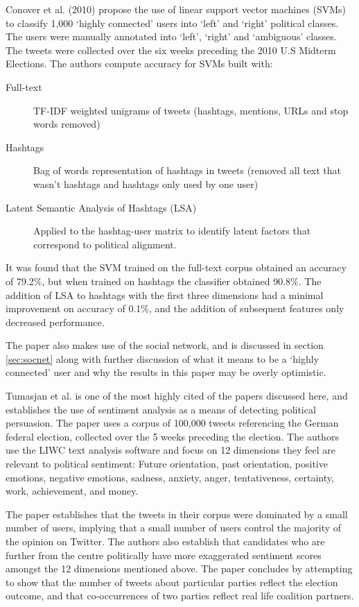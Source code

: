 \documentclass[bsc,frontabs,singlespacing,parskip]{infthesis}     %
\begin{document}
Conover et al. (2010) \cite{Conover2010predicting} propose the use of linear support vector machines (SVMs) to classify 1,000 `highly connected' users into `left' and `right' political classes. The users were manually annotated into `left', `right' and `ambiguous' classes. The tweets were collected over the six weeks preceding the 2010 U.S Midterm Elections. The authors compute accuracy for SVMs built with:
\begin{description}
\item[Full-text] TF-IDF weighted unigrams of tweets (hashtags, mentions, URLs and stop words removed)
\item[Hashtags] Bag of words representation of hashtags in tweets (removed all text that wasn't hashtags and hashtags only used by one user)
\item[Latent Semantic Analysis of Hashtags (LSA)] Applied to the hashtag-user matrix to identify latent factors that correspond to political alignment. 
\end{description}

It was found that the SVM trained on the full-text corpus obtained an accuracy of 79.2\%, but when trained on hashtags the classifier obtained 90.8\%. The addition of LSA to hashtags with the first three dimensions had a minimal improvement on accuracy of 0.1\%, and the addition of subsequent features only decreased performance. 

The paper also makes use of the social network, and is discussed in section \ref{sec:socnet} along with further discussion of what it means to be a `highly connected' user and why the results in this paper may be overly optimistic.

Tumasjan et al. \cite{predelections} is one of the most highly cited of the papers discussed here, and establishes the use of sentiment analysis as a means of detecting political persuasion. The paper uses a corpus of 100,000 tweets referencing the German federal election, collected over the 5 weeks preceding the election. The authors use the LIWC text analysis software and focus on 12 dimensions they feel are relevant to political sentiment: Future orientation, past orientation, positive emotions, negative emotions, sadness, anxiety, anger, tentativeness, certainty, work, achievement, and money.

The paper establishes that the tweets in their corpus were dominated by a small number of users, implying that a  small number of users control the majority of the opinion on Twitter. The authors also establish that candidates who are further from the centre politically have more exaggerated sentiment scores amongst the 12 dimensions mentioned above. The paper concludes by attempting to show that the number of tweets about particular parties reflect the election outcome, and that co-occurrences of two parties reflect real life coalition partners. 
\end{document}
